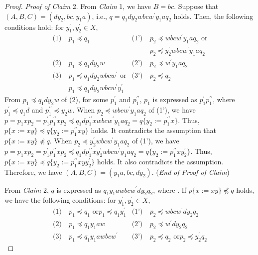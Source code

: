 \begin{proof}
  \smallskip
  \noindent
  \textit{Proof of Claim} 2.
  From \textit{Claim} 1, we have $B=bc$. Suppose that $(A, B, C) = (dy_{2}, bc, y_{1}a)$, i.e., $q = q_{1}dy_{2}wbcw^{\prime}y_{1}aq_{2} $ holds. Then, the following conditions hold: for $y_{1}^{\prime},y_{2}^{\prime}\in X$,
  \begin{align*}
  \textrm{(1)}~& p_{1} \preceq q_{1} & \textrm{(1')}~& p_{2} \preceq wbcw^{\prime}y_{1}aq_{2}\mbox{ or}\\
  & & & p_{2} \preceq y_{2}^{\prime}wbcw^{\prime}y_{1}aq_{2}\\
  \textrm{(2)}~& p_{1} \preceq q_{1}dy_{2}w & \textrm{(2')}~& p_{2} \preceq w^{\prime}y_{1}aq_{2} \\
  \textrm{(3)}~& p_{1} \preceq q_{1}dy_{2}wbcw^{\prime}\mbox{ or} & \textrm{(3')}~& p_{2} \preceq q_{2}\\
  & p_{1} \preceq q_{1}dy_{2}wbcw^{\prime}y_{1}^{\prime}& &
  \end{align*}
  From $p_{1} \preceq q_{1}dy_{2}w$ of (2), for some $p^{\prime}_{1}$ and $p^{\prime\prime}_{1}$, $p_{1}$ is expressed as $p^{\prime}_{1}p^{\prime\prime}_{1}$, where $p^{\prime}_{1} \preceq q_{1}d$ and $p^{\prime\prime}_{1} \preceq y_{2}w$. 
  When $p_{2} \preceq wbcw^{\prime}y_{1}aq_{2}$ of (1'), we have $p=p_{1}xp_{2}=p^{\prime}_{1}p^{\prime\prime}_{1}xp_{2} \preceq q_{1}dp^{\prime\prime}_{1}xwbcw^{\prime}y_{1}aq_{2}=q \{ y_{2}:=p^{\prime\prime}_{1}x \}$. Thus, $p \{ x := xy \} \preceq q \{ y_{2}:=p^{\prime\prime}_{1}xy \}$ holds. It contradicts the assumption that $p \{ x := xy \} \not \preceq q$.
  When $p_{2} \preceq y_{2}^{\prime}wbcw^{\prime}y_{1}aq_{2}$ of (1'), we have $p=p_{1}xp_{2}=p^{\prime}_{1}p^{\prime\prime}_{1}xp_{2} \preceq q_{1}dp^{\prime\prime}_{1}xy_{2}^{\prime}wbcw^{\prime}y_{1}aq_{2}=q \{ y_{2}:=p^{\prime\prime}_{1}xy_{2}^{\prime} \}$.
  Thus, $p \{ x := xy \} \preceq q \{ y_{2}:=p^{\prime\prime}_{1}xyy_{2}^{\prime} \}$ holds. It also contradicts the assumption.
  Therefore, we have $(A, B, C) = (y_{1}a, bc, dy_{2})$.
  (\textit{End of Proof of Claim})

  \smallskip

  From \textit{Claim} 2, $q$ is expressed as $q_{1}y_{1}awbcw^{\prime}dy_{2}q_{2}$, where \TheConditionA.
  If $p \{ x := xy \} \not \preceq q$ holds, we have the following conditions:
  for $y_{1}^{\prime},y_{2}^{\prime}\in X$,
  \begin{align*}
    \textrm{(1)}~& p_{1} \preceq q_{1} \mbox{ or} p_{1} \preceq q_{1}y_{1}^{\prime} & \textrm{(1')}~& p_{2} \preceq wbcw^{\prime}dy_{2}q_{2} \\
    \textrm{(2)}~& p_{1} \preceq q_{1}y_{1}aw & \textrm{(2')}~& p_{2} \preceq w^{\prime}dy_{2}q_{2} \\
    \textrm{(3)}~& p_{1} \preceq q_{1}y_{1}awbcw^{\prime} & \textrm{(3')}~& p_{2} \preceq q_{2} \mbox{ or} p_{2} \preceq y_{2}^{\prime}q_{2}
  \end{align*}


\end{proof}
